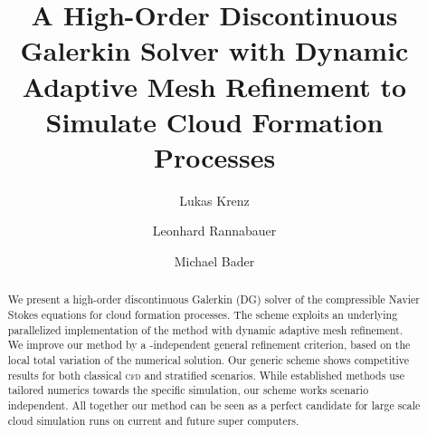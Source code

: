 \documentclass[runningheads]{llncs}
\title{A High-Order Discontinuous Galerkin Solver with Dynamic Adaptive Mesh Refinement to Simulate Cloud Formation Processes }
\author{Lukas Krenz\inst{1} \and{} Leonhard Rannabauer\inst{1} \and{} Michael Bader\inst{1}}
\institute{Department of Informatics, Technical University of Munich} %
\begin{document}
\maketitle 
\begin{abstract}
  We present a high-order discontinuous Galerkin (DG) solver of the compressible Navier Stokes equations for cloud formation processes.
  The scheme exploits an underlying parallelized implementation of the \aderdg{} method with dynamic adaptive mesh refinement. 
  We improve our method by a \pde-independent general refinement criterion, based on the local total variation of the numerical solution.
  Our generic scheme shows competitive results for both classical \textsc{cfd} and stratified scenarios.
  While established methods use tailored numerics towards the specific simulation, our scheme works scenario independent.
  All together our method can be seen as a perfect candidate for large scale cloud simulation runs on current and future super computers.

  

\end{abstract}
\end{document}
